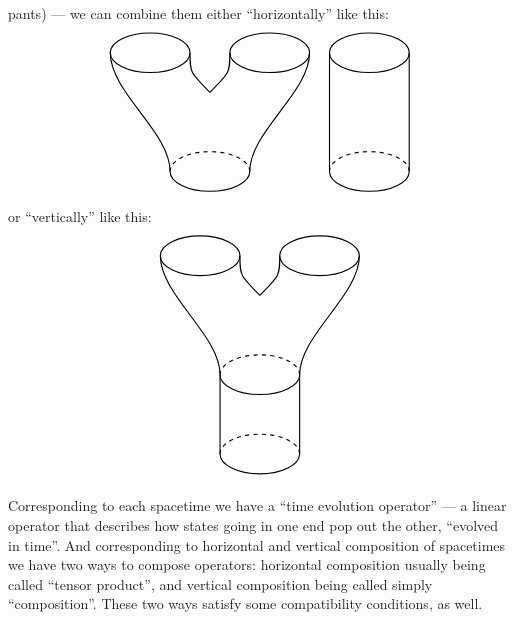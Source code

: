 \documentclass{article}
\begin{document}
pants) --- we can combine them either ``horizontally'' like this: \[
  \begin{tikzpicture}[scale=0.5]
    \begin{scope}[shift={(8,0)}]
      \draw[thick] (0,0) ellipse (2cm and 1cm);
      \draw[thick] (-2,0) to (-2,-6);
      \draw[thick] (2,0) to (2,-6);
      \begin{scope}[shift={(0,-6)}]
        \draw[thick,dashed] (0:2) arc (0:180:2cm and 1cm);
        \draw[thick] (180:2) arc (180:360:2cm and 1cm);
      \end{scope}
    \end{scope}
    \draw[thick] (-3,0) ellipse (2cm and 1cm);
    \draw[thick] (3,0) ellipse (2cm and 1cm);
    \draw[thick] (-5,0) .. controls (-5,-2) and (-2,-4) .. (-2,-6);
    \draw[thick] (5,0) .. controls (5,-2) and (2,-4) .. (2,-6);
    \draw[thick] (-1,0) .. controls (-1,-1) .. (0,-2);
    \draw[thick] (1,0) .. controls (1,-1) .. (0,-2);
    \begin{scope}[shift={(0,-6)}]
      \draw[thick,dashed] (0:2) arc (0:180:2cm and 1cm);
      \draw[thick] (180:2) arc (180:360:2cm and 1cm);
    \end{scope}
  \end{tikzpicture}
\] or ``vertically'' like this: \[
  \begin{tikzpicture}[scale=0.5]
    \draw[thick] (-3,0) ellipse (2cm and 1cm);
    \draw[thick] (3,0) ellipse (2cm and 1cm);
    \draw[thick] (-5,0) .. controls (-5,-2) and (-2,-4) .. (-2,-6);
    \draw[thick] (5,0) .. controls (5,-2) and (2,-4) .. (2,-6);
    \draw[thick] (-1,0) .. controls (-1,-1) .. (0,-2);
    \draw[thick] (1,0) .. controls (1,-1) .. (0,-2);
    \begin{scope}[shift={(0,-6)}]
      \draw[thick,dashed] (0:2) arc (0:180:2cm and 1cm);
      \draw[thick] (180:2) arc (180:360:2cm and 1cm);
    \end{scope}
    \draw[thick] (-2,-6) to (-2,-10);
    \draw[thick] (2,-6) to (2,-10);
    \begin{scope}[shift={(0,-10)}]
      \draw[thick,dashed] (0:2) arc (0:180:2cm and 1cm);
      \draw[thick] (180:2) arc (180:360:2cm and 1cm);
    \end{scope}
  \end{tikzpicture}
\]

Corresponding to each spacetime we have a ``time evolution operator''
--- a linear operator that describes how states going in one end pop out
the other, ``evolved in time''. And corresponding to horizontal and
vertical composition of spacetimes we have two ways to compose
operators: horizontal composition usually being called ``tensor
product'', and vertical composition being called simply ``composition''.
These two ways satisfy some compatibility conditions, as well.
\end{document}

